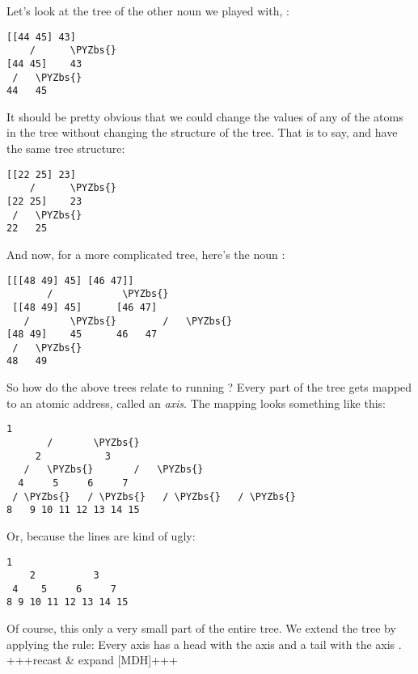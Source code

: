 Let's look at the tree of the other noun we played with, \kode{[[44 45] 43]}:
\begin{framed_shaded}
\begin{Verbatim}[fontsize=\relsize{-2.5},commandchars=\\\{\}]
 [[44 45] 43]
    /      \PYZbs{}
[44 45]    43
 /   \PYZbs{}
44   45
\end{Verbatim}
\end{framed_shaded}
It should be pretty obvious that we could change the values of any of the atoms
in the tree without changing the structure of the tree. That is to say, \kode{[[44
45] 43]} and \kode{[[24 25] 23]} have the same tree structure:
\begin{framed_shaded}
\begin{Verbatim}[fontsize=\relsize{-2.5},commandchars=\\\{\}]
 [[22 25] 23]
    /      \PYZbs{}
[22 25]    23
 /   \PYZbs{}
22   25
\end{Verbatim}
\end{framed_shaded}
And now, for a more complicated tree, here's the noun \kode{[[[48 49] 45] [46 47]]}:
\begin{framed_shaded}
\begin{Verbatim}[fontsize=\relsize{-2.5},commandchars=\\\{\}]
  [[[48 49] 45] [46 47]]
       /            \PYZbs{}
 [[48 49] 45]      [46 47]
   /       \PYZbs{}        /   \PYZbs{}
[48 49]    45      46   47
 /   \PYZbs{}
48   49
\end{Verbatim}
\end{framed_shaded}
So how do the above trees relate to running ? Every part
of the tree gets mapped to an atomic address, called an \emph{axis}. The mapping
looks something like this:
\begin{framed_shaded}
\begin{Verbatim}[fontsize=\relsize{-2.5},commandchars=\\\{\}]
           1
       /       \PYZbs{}
     2           3
   /   \PYZbs{}       /   \PYZbs{}
  4     5     6     7
 / \PYZbs{}   / \PYZbs{}   / \PYZbs{}   / \PYZbs{}
8   9 10 11 12 13 14 15
\end{Verbatim}
\end{framed_shaded}
Or, because the lines are kind of ugly:
\begin{framed_shaded}
\begin{Verbatim}[fontsize=\relsize{-2.5},commandchars=\\\{\}]
         1
    2          3
 4    5     6     7
8 9 10 11 12 13 14 15
\end{Verbatim}
\end{framed_shaded}
Of course, this only a very small part of the entire tree. We extend the tree
by applying the rule: Every axis  has a head with the axis and a tail
with the axis . +++recast \& expand [MDH]+++

